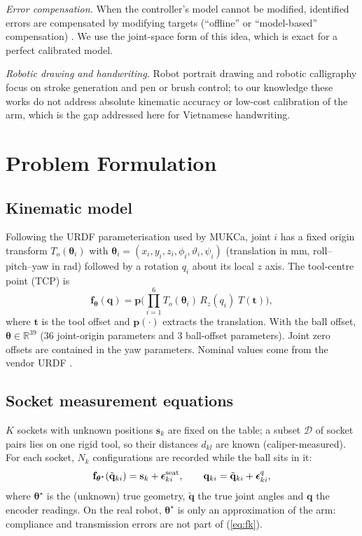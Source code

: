 \documentclass[conference]{IEEEtran}
\newcommand{\R}{\mathbb{R}}
\begin{document}
\textit{Error compensation.} When the controller's model cannot be modified, identified errors are compensated by modifying
targets (``offline'' or ``model-based'' compensation) \cite{nubiola2013,liao2023,alam2022}. We use the joint-space form of
this idea, which is exact for a perfect calibrated model.

\textit{Robotic drawing and handwriting.} Robot portrait drawing \cite{lin2009,nasrat2023} and robotic calligraphy
\cite{guo2025} focus on stroke generation and pen or brush control; to our knowledge these works do not address absolute
kinematic accuracy or low-cost calibration of the arm, which is the gap addressed here for Vietnamese handwriting.

\section{Problem Formulation}
\subsection{Kinematic model}
Following the URDF parameterisation used by MUKCa, joint $i$ has a fixed origin transform $T_o(\boldsymbol\theta_i)$ with
$\boldsymbol\theta_i=(x_i,y_i,z_i,\phi_i,\vartheta_i,\psi_i)$ (translation in mm, roll--pitch--yaw in rad) followed by a
rotation $q_i$ about its local $z$ axis. The tool-centre point (TCP) is
\begin{equation}
\mathbf{f}_{\boldsymbol\theta}(\mathbf q)=\mathbf{p}\Big(\prod_{i=1}^{6}T_o(\boldsymbol\theta_i)\,R_z(q_i)\;
T(\mathbf t)\Big),\label{eq:fk}
\end{equation}
where $\mathbf t$ is the tool offset and $\mathbf p(\cdot)$ extracts the translation. With the ball offset,
$\boldsymbol\theta\in\R^{39}$ (36 joint-origin parameters and 3 ball-offset parameters). Joint zero offsets are contained in
the yaw parameters. Nominal values come from the vendor URDF \cite{frcoburdf}.

\subsection{Socket measurement equations}
$K$ sockets with unknown positions $\mathbf s_k$ are fixed on the table; a subset $\mathcal D$ of socket pairs lies on one
rigid tool, so their distances $d_{kl}$ are known (caliper-measured). For each socket, $N_k$ configurations are recorded
while the ball sits in it:
\begin{equation}
\mathbf f_{\boldsymbol\theta^\star}(\tilde{\mathbf q}_{ki}) = \mathbf s_k + \boldsymbol\epsilon^{\rm seat}_{ki},\qquad
\mathbf q_{ki}=\tilde{\mathbf q}_{ki}+\boldsymbol\epsilon^{q}_{ki},\label{eq:meas}
\end{equation}
where $\boldsymbol\theta^\star$ is the (unknown) true geometry, $\tilde{\mathbf q}$ the true joint angles and $\mathbf q$ the
encoder readings. On the real robot, $\boldsymbol\theta^\star$ is only an approximation of the arm: compliance and transmission
errors are not part of (\ref{eq:fk}).
\end{document}
